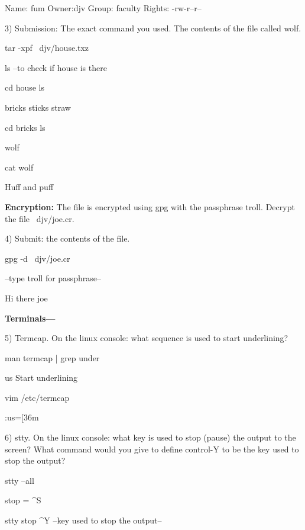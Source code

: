 Name: fum
Owner:djv
Group: faculty
Rights: -rw-r--r--


3) Submission: The exact command you used. The contents
of the file called {\ltt{}wolf}.

tar -xpf ~djv/house.txz

ls --to check if house is there

cd house
ls

bricks	sticks	straw

cd bricks
ls

wolf

cat wolf

Huff and puff


{\bf Encryption:}
The file is encrypted using gpg with the passphrase {\ltt{}troll}.
Decrypt the file {\ltt{}~djv/joe.cr}.

4) Submit: the contents of the file.

gpg -d ~djv/joe.cr

--type troll for passphrase--

Hi there joe


{\bf Terminals---}

5) Termcap.
On the linux console: what sequence is used to 
start underlining?

man termcap | grep under

us Start underlining

vim /etc/termcap

:us=\E[36m


6) stty.
On the linux console: what key is used to stop (pause) the output to the
screen?
What command would you give to define control-Y to be the key used
to stop the output?

stty --all

stop = ^S

stty stop ^Y --key used to stop the output--

\bye
